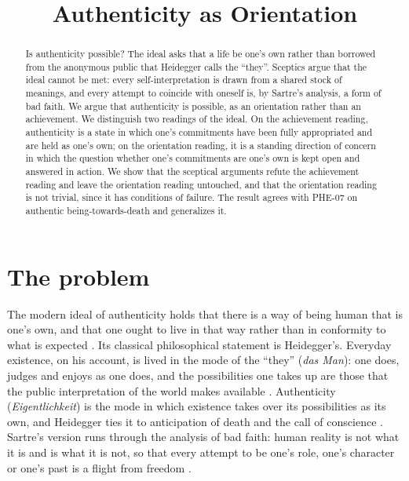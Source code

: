 \documentclass{situationist-preprint}
\title{Authenticity as Orientation}
\begin{document}
\maketitle

\begin{abstract}
Is authenticity possible? The ideal asks that a life be one's own rather than borrowed from the anonymous public that Heidegger calls the \enquote{they}. Sceptics argue that the ideal cannot be met: every self-interpretation is drawn from a shared stock of meanings, and every attempt to coincide with oneself is, by Sartre's analysis, a form of bad faith. We argue that authenticity is possible, as an orientation rather than an achievement. We distinguish two readings of the ideal. On the achievement reading, authenticity is a state in which one's commitments have been fully appropriated and are held as one's own; on the orientation reading, it is a standing direction of concern in which the question whether one's commitments are one's own is kept open and answered in action. We show that the sceptical arguments refute the achievement reading and leave the orientation reading untouched, and that the orientation reading is not trivial, since it has conditions of failure. The result agrees with PHE-07 on authentic being-towards-death and generalizes it.
\end{abstract}

\section{The problem}

The modern ideal of authenticity holds that there is a way of being human that is one's own, and that one ought to live in that way rather than in conformity to what is expected \citep{Trilling1972,Taylor1991}. Its classical philosophical statement is Heidegger's. Everyday existence, on his account, is lived in the mode of the \enquote{they} (\emph{das Man}): one does, judges and enjoys as one does, and the possibilities one takes up are those that the public interpretation of the world makes available \citep[\S 27]{Heidegger1927}. Authenticity (\emph{Eigentlichkeit}) is the mode in which existence takes over its possibilities as its own, and Heidegger ties it to anticipation of death and the call of conscience \citep[\S\S 53--60]{Heidegger1927}. Sartre's version runs through the analysis of bad faith: human reality is not what it is and is what it is not, so that every attempt to be one's role, one's character or one's past is a flight from freedom \citep[Part I, ch.~2]{Sartre1943}.
\end{document}
